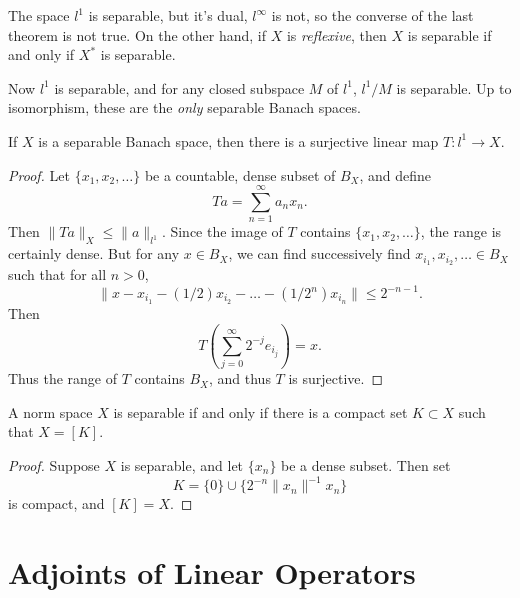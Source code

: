 The space $l^1$ is separable, but it's dual, $l^\infty$ is not, so the converse of the last theorem is not true. On the other hand, if $X$ is \emph{reflexive}, then $X$ is separable if and only if $X^*$ is separable.

Now $l^1$ is separable, and for any closed subspace $M$ of $l^1$, $l^1 / M$ is separable. Up to isomorphism, these are the \emph{only} separable Banach spaces.

\begin{theorem}
    If $X$ is a separable Banach space, then there is a surjective linear map $T: l^1 \to X$.
\end{theorem}
\begin{proof}
    Let $\{ x_1, x_2, \dots \}$ be a countable, dense subset of $B_X$, and define
    \[ Ta = \sum_{n = 1}^\infty a_n x_n. \]
    Then $\| Ta \|_X \leq \| a \|_{l^1}$. Since the image of $T$ contains $\{ x_1, x_2, \dots \}$, the range is certainly dense. But for any $x \in B_X$, we can find successively find $x_{i_1}, x_{i_2}, \dots \in B_X$ such that for all $n > 0$,
    \[ \| x - x_{i_1} - (1/2) x_{i_2} - \dots - (1/2^n) x_{i_n} \| \leq 2^{-n-1}. \]
    Then
    \[ T \left( \sum_{j = 0}^\infty 2^{-j} e_{i_j} \right) = x. \]
    Thus the range of $T$ contains $B_X$, and thus $T$ is surjective.
\end{proof}

\begin{theorem}
    A norm space $X$ is separable if and only if there is a compact set $K \subset X$ such that $X = [K]$.
\end{theorem}
\begin{proof}
    Suppose $X$ is separable, and let $\{ x_n \}$ be a dense subset. Then set
    \[ K = \{ 0 \} \cup \{ 2^{-n} \| x_n \|^{-1} x_n \} \]
    is compact, and $[K] = X$.
\end{proof}






\section{Adjoints of Linear Operators}

